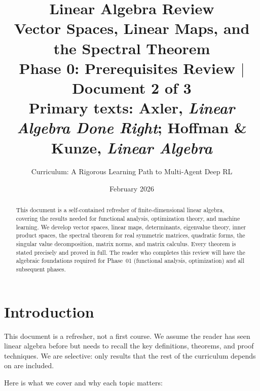 \documentclass[11pt,a4paper]{article}
\title{\textbf{Linear Algebra Review}\\[10pt]
\large Vector Spaces, Linear Maps, and the Spectral Theorem\\[5pt]
\normalsize Phase 0: Prerequisites Review $\mid$ Document 2 of 3\\
\normalsize Primary texts: Axler, \emph{Linear Algebra Done Right}; Hoffman \& Kunze, \emph{Linear Algebra}}
\author{Curriculum: A Rigorous Learning Path to Multi-Agent Deep RL}
\date{February 2026}
\theoremstyle{definition}
\theoremstyle{plain}
\theoremstyle{remark}
\begin{document}
\maketitle

\begin{abstract}
This document is a self-contained refresher of finite-dimensional linear algebra,
covering the results needed for functional analysis, optimization theory, and
machine learning. We develop vector spaces, linear maps, determinants, eigenvalue
theory, inner product spaces, the spectral theorem for real symmetric matrices,
quadratic forms, the singular value decomposition, matrix norms, and matrix
calculus. Every theorem is stated precisely and proved in full. The reader who
completes this review will have the algebraic foundations required for
Phase~01 (functional analysis, optimization) and all subsequent phases.
\end{abstract}

\tableofcontents
\newpage

\section{Introduction}
\label{sec:intro}

This document is a refresher, not a first course. We assume the reader has seen
linear algebra before but needs to recall the key definitions, theorems, and proof
techniques. We are selective: only results that the rest of the curriculum depends
on are included.

Here is what we cover and why each topic matters:
\end{document}

